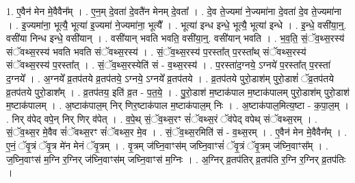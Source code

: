 \documentclass[17pt]{extarticle}
\begin{document}
1. ए॒वैन॑ मेन मे॒वैवैन᳚म् । . ए॒न॒म् दे॒वता॑ दे॒वतै॑न मेनम् दे॒वता᳚ । . दे॒व ते॒ज्यमा॑ ने॒ज्यमा॑ना दे॒वता॑ दे॒व ते॒ज्यमा॑ना । . इ॒ज्यमा॑ना॒ भूत्यै॒ भूत्या॑ इ॒ज्यमा॑ ने॒ज्यमा॑ना॒ भूत्यै᳚ । . भूत्या॑ इन्ध इन्धे॒ भूत्यै॒ भूत्या॑ इन्धे । . इ॒न्धे॒ वसी॑या॒न्॒. वसी॑या निन्ध इन्धे॒ वसी॑यान् । . वसी॑यान् भवति भवति॒ वसी॑या॒न्॒. वसी॑यान् भवति । . भ॒व॒ति॒ सं॒ॅव॒थ्स॒रस्य॑ संॅवथ्स॒रस्य॑ भवति भवति संॅवथ्स॒रस्य॑ । . सं॒ॅव॒थ्स॒रस्य॑ प॒रस्ता᳚त् प॒रस्ता᳚थ् संॅवथ्स॒रस्य॑ संॅवथ्स॒रस्य॑ प॒रस्ता᳚त् । . सं॒ॅव॒थ्स॒रस्येति॑ सं - व॒थ्स॒रस्य॑ । . प॒रस्ता॑द॒ग्नये॒ ऽग्नये॑ प॒रस्ता᳚त् प॒रस्ता॑ द॒ग्नये᳚ । . अ॒ग्नये᳚ व्र॒तप॑तये व्र॒तप॑तये॒ ऽग्नये॒ ऽग्नये᳚ व्र॒तप॑तये । . व्र॒तप॑तये पुरो॒डाश॑म् पुरो॒डाशं॑ ॅव्र॒तप॑तये व्र॒तप॑तये पुरो॒डाश᳚म् । . व्र॒तप॑तय॒ इति॑ व्र॒त - प॒त॒ये॒ । . पु॒रो॒डाश॑ म॒ष्टाक॑पाल म॒ष्टाक॑पालम् पुरो॒डाश॑म् पुरो॒डाश॑ म॒ष्टाक॑पालम् । . अ॒ष्टाक॑पाल॒म् निर् णिर॒ष्टाक॑पाल म॒ष्टाक॑पाल॒म् निः । . अ॒ष्टाक॑पाल॒मित्य॒ष्टा - क॒पा॒ल॒म् । . निर् व॑पेद् वपे॒न् निर् णिर् व॑पेत् । . व॒पे॒थ् सं॒ॅव॒थ्स॒रꣳ सं॑ॅवथ्स॒रं ॅव॑पेद् वपेथ् संॅवथ्स॒रम् । . सं॒ॅव॒थ्स॒र मे॒वैव सं॑ॅवथ्स॒रꣳ सं॑ॅवथ्स॒र मे॒व । . सं॒ॅव॒थ्स॒रमिति॑ सं - व॒थ्स॒रम् । . ए॒वैन॑ मेन मे॒वैवैन᳚म् । . ए॒नं॒ ॅवृ॒त्रं ॅवृ॒त्र मे॑न मेनं ॅवृ॒त्रम् । . वृ॒त्रम् ज॑घ्नि॒वाꣳस॑म् जघ्नि॒वाꣳसं॑ ॅवृ॒त्रं ॅवृ॒त्रम् ज॑घ्नि॒वाꣳस᳚म् । . ज॒घ्नि॒वाꣳस॑ म॒ग्नि र॒ग्निर् ज॑घ्नि॒वाꣳस॑म् जघ्नि॒वाꣳस॑ म॒ग्निः । . अ॒ग्निर् व्र॒तप॑तिर् व्र॒तप॑ति र॒ग्नि र॒ग्निर् व्र॒तप॑तिः । \newline
\end{document}
